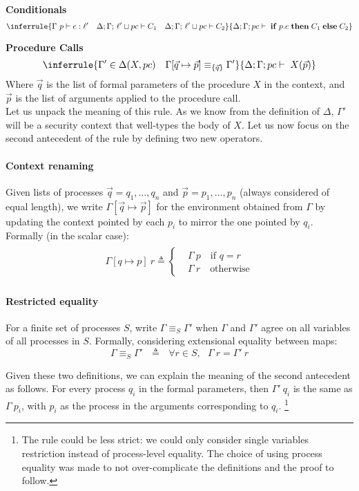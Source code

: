 \documentclass[12pt,a4paper,twoside]{book}
\begin{document}
\medskip
\noindent\textbf{Conditionals}
\[
  \inferrule
  { \Gamma~p \vdash e : \ell'
    \quad
    \Delta;\Gamma;\,\ell' \sqcup pc \vdash C_1
    \quad
    \Delta;\Gamma;\,\ell' \sqcup pc \vdash C_2 }
  {\Delta;\Gamma;pc \vdash \; \mathbf{if}\;p.e\;\mathbf{then}\;C_1\;\mathbf{else}\;C_2}
\]

\medskip
\noindent\textbf{Procedure Calls}
\[
  \inferrule
  { \Gamma' \in \Delta(X,pc) 
    \quad
    \Gamma[\vec{q}\mapsto \vec{p}] \equiv_{\{\vec{q}\}} \Gamma' }
  { \Delta;\Gamma;pc \vdash \; X(\vec{p})}
\]
Where $\vec{q}$ is the list of formal parameters of the procedure $X$ in the context, and $\vec{p}$ is the list of arguments applied to the procedure call.\\
Let us unpack the meaning of this rule.
As we know from the definition of $\Delta$, $\Gamma'$ will be a security context that well-types the body of $X$.
Let us now focus on the second antecedent of the rule by defining two new operators.
\paragraph{Context renaming}
Given lists of processes $\vec{q} = q_1,\dots,q_n$ and $\vec{p} = p_1,\dots,p_n$ (always considered of equal length), we write
$\Gamma[\vec{q}\mapsto \vec{p}]$
for the environment obtained from $\Gamma$ by updating the context pointed by each $p_i$ to mirror the one pointed by $q_i$. Formally (in the scalar case):
\begin{align}
\begin{split}\label{def:context_renaming}
	\Gamma[q \mapsto p]~r \triangleq
    \begin{cases}
    &\Gamma~p \quad \text{if $q = r$}\\
    &\Gamma~r \quad \text{otherwise}
    \end{cases}
\end{split}
\end{align}
\paragraph{Restricted equality}
For a finite set of processes $S$, write $\Gamma \equiv_S \Gamma'$ when $\Gamma$ and $\Gamma'$ agree on all variables of all processes in $S$. Formally, considering extensional equality between maps:
$$ \Gamma \equiv_S \Gamma' ~~~\triangleq~~~ \forall r \in S,~~~\Gamma~r = \Gamma'~r$$

Given these two definitions, we can explain the meaning of the second antecedent as follows. For every process $q_i$ in the formal parameters, then $\Gamma'~q_i$ is the same as $\Gamma~p_i$, with $p_i$ as the process in the arguments corresponding to $q_i$. \footnote{The rule could be less strict: we could only consider single variables restriction instead of process-level equality. The choice of using process equality was made to not over-complicate the definitions and the proof to follow.}
\end{document}
